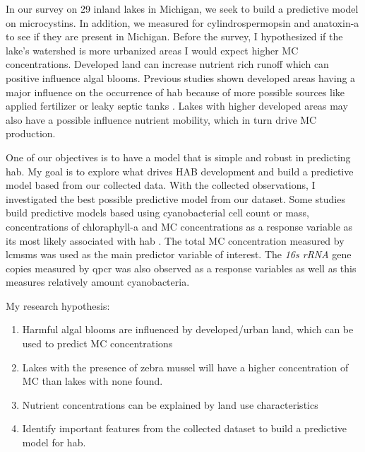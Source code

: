 In our survey on 29 inland lakes in Michigan, we seek to build a predictive model on microcystins. In addition, we  measured for cylindrospermopsin and anatoxin-a to see if they are present in Michigan. Before the survey, I hypothesized if the lake's watershed is more urbanized areas I would expect higher MC concentrations. Developed land can increase nutrient rich runoff which can positive influence algal blooms. Previous studies shown developed areas having a major influence on the occurrence of \gls{hab} because of more possible sources like applied fertilizer or leaky septic tanks \cite{beaver_land_2014, anderson_harmful_2002}. Lakes with higher developed areas may also have a possible influence nutrient mobility, which in turn drive MC production.

One of our objectives is to have a model that is simple and robust in predicting \gls{hab}.
My goal is to explore what drives HAB development and build a predictive model based from our collected data.  With the collected observations, I investigated the best possible predictive model from our dataset.
Some studies build predictive models based using cyanobacterial cell count or mass, concentrations of chloraphyll-a and MC concentrations as a response variable as its most likely associated with \gls{hab} \cite{moore_richard_cyanobacterial_1993, ahn_evaluation_2011, jiang_statistical_2008, beaulieu_nutrients_2013, taranu_predicting_2017}.
The total MC concentration measured by \gls{lcmsms} was used as the main predictor variable of interest. The \emph{16s rRNA} gene copies measured by \gls{qpcr} was also observed as a response variables as well as this measures relatively amount cyanobacteria.



My research hypothesis:

\begin{enumerate}
 \item Harmful algal blooms are influenced by  developed/urban land, which can be used to predict MC concentrations
 \item Lakes with the presence of zebra mussel will have a higher concentration of MC than lakes with none found.
 \item Nutrient concentrations can be explained by land use characteristics
 \item Identify important features from the collected dataset to build a predictive model for \gls{hab}.

\end{enumerate}
